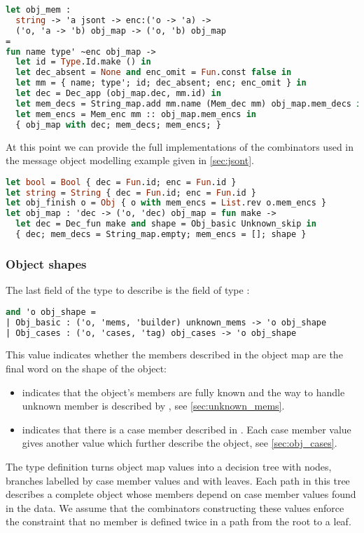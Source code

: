 \documentclass[nolinenum]{jfp}
\begin{document}
\begin{lstlisting}[language=ocaml]
let obj_mem :
  string -> 'a jsont -> enc:('o -> 'a) ->
  ('o, 'a -> 'b) obj_map -> ('o, 'b) obj_map
=
fun name type' ~enc obj_map ->
  let id = Type.Id.make () in
  let dec_absent = None and enc_omit = Fun.const false in
  let mm = { name; type'; id; dec_absent; enc; enc_omit } in
  let dec = Dec_app (obj_map.dec, mm.id) in
  let mem_decs = String_map.add mm.name (Mem_dec mm) obj_map.mem_decs in
  let mem_encs = Mem_enc mm :: obj_map.mem_encs in
  { obj_map with dec; mem_decs; mem_encs; }
\end{lstlisting}
%
At this point we can provide the full implementations of the combinators
used in the message object modelling example given in \autoref{sec:jsont}.
%
\begin{lstlisting}[language=ocaml]
let bool = Bool { dec = Fun.id; enc = Fun.id }
let string = String { dec = Fun.id; enc = Fun.id }
let obj_finish o = Obj { o with mem_encs = List.rev o.mem_encs }
let obj_map : 'dec -> ('o, 'dec) obj_map = fun make ->
  let dec = Dec_fun make and shape = Obj_basic Unknown_skip in
  { dec; mem_decs = String_map.empty; mem_encs = []; shape }
\end{lstlisting}

\pagebreak
\subsubsection{Object shapes}
\label{sec:obj_shape}

The last field of the  type to describe is the
 field of type :
\begin{lstlisting}[language=ocaml]
and 'o obj_shape =
| Obj_basic : ('o, 'mems, 'builder) unknown_mems -> 'o obj_shape
| Obj_cases : ('o, 'cases, 'tag) obj_cases -> 'o obj_shape
\end{lstlisting}
%
This value indicates whether the members described in the object map
are the final word on the shape of the object:

\begin{itemize}
\item {} indicates that the object's members are fully
known and the way to handle unknown member is described by , see \autoref{sec:unknown_mems}.
\item {} indicates that there is a case
  member described in . Each case member value
  gives another  value which further describe the object, see
  \autoref{sec:obj_cases}.
\end{itemize}
%
The  type definition turns object map values into a
decision tree with  nodes, branches labelled by case
member values and with  leaves. Each path in this tree
describes a complete object whose members depend on case member
values found in the data. We assume that the combinators constructing
these values enforce the constraint that no member is defined twice in
a path from the root to a leaf.
\end{document}

